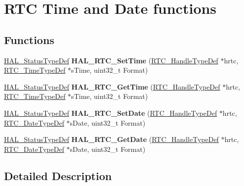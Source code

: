 \hypertarget{group___r_t_c___exported___functions___group2}{}\section{R\+TC Time and Date functions}
\label{group___r_t_c___exported___functions___group2}
\subsection*{Functions}
\begin{DoxyCompactItemize}
\item 
\mbox{\label{group___r_t_c___exported___functions___group2_gafe0fed98171a564decd2a6c9be9781d8}} 
\hyperlink{stm32f0xx__hal__def_8h_a63c0679d1cb8b8c684fbb0632743478f}{H\+A\+L\+\_\+\+Status\+Type\+Def} {\bfseries H\+A\+L\+\_\+\+R\+T\+C\+\_\+\+Set\+Time} (\hyperlink{struct_r_t_c___handle_type_def}{R\+T\+C\+\_\+\+Handle\+Type\+Def} $\ast$hrtc, \hyperlink{struct_r_t_c___time_type_def}{R\+T\+C\+\_\+\+Time\+Type\+Def} $\ast$s\+Time, uint32\+\_\+t Format)
\item 
\mbox{\label{group___r_t_c___exported___functions___group2_gae478ca2647e8d2f7dd1828ce43889a9e}} 
\hyperlink{stm32f0xx__hal__def_8h_a63c0679d1cb8b8c684fbb0632743478f}{H\+A\+L\+\_\+\+Status\+Type\+Def} {\bfseries H\+A\+L\+\_\+\+R\+T\+C\+\_\+\+Get\+Time} (\hyperlink{struct_r_t_c___handle_type_def}{R\+T\+C\+\_\+\+Handle\+Type\+Def} $\ast$hrtc, \hyperlink{struct_r_t_c___time_type_def}{R\+T\+C\+\_\+\+Time\+Type\+Def} $\ast$s\+Time, uint32\+\_\+t Format)
\item 
\mbox{\label{group___r_t_c___exported___functions___group2_ga6cf6c70227337a564ccef82f64d6268f}} 
\hyperlink{stm32f0xx__hal__def_8h_a63c0679d1cb8b8c684fbb0632743478f}{H\+A\+L\+\_\+\+Status\+Type\+Def} {\bfseries H\+A\+L\+\_\+\+R\+T\+C\+\_\+\+Set\+Date} (\hyperlink{struct_r_t_c___handle_type_def}{R\+T\+C\+\_\+\+Handle\+Type\+Def} $\ast$hrtc, \hyperlink{struct_r_t_c___date_type_def}{R\+T\+C\+\_\+\+Date\+Type\+Def} $\ast$s\+Date, uint32\+\_\+t Format)
\item 
\mbox{\label{group___r_t_c___exported___functions___group2_ga07ec2e43a305aa55e8c2442a349fc505}} 
\hyperlink{stm32f0xx__hal__def_8h_a63c0679d1cb8b8c684fbb0632743478f}{H\+A\+L\+\_\+\+Status\+Type\+Def} {\bfseries H\+A\+L\+\_\+\+R\+T\+C\+\_\+\+Get\+Date} (\hyperlink{struct_r_t_c___handle_type_def}{R\+T\+C\+\_\+\+Handle\+Type\+Def} $\ast$hrtc, \hyperlink{struct_r_t_c___date_type_def}{R\+T\+C\+\_\+\+Date\+Type\+Def} $\ast$s\+Date, uint32\+\_\+t Format)
\end{DoxyCompactItemize}


\subsection{Detailed Description}
